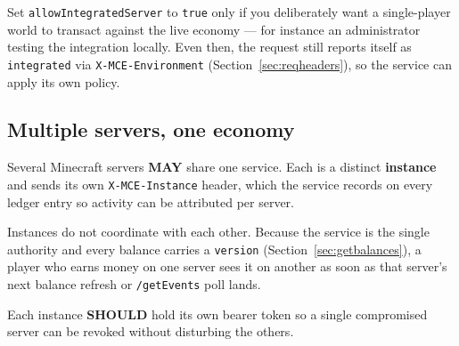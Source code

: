 \documentclass[11pt,a4paper]{article}
\newcommand{\code}[1]{\texttt{\small #1}}
\newcommand{\rec}{\textbf{SHOULD}}
\newcommand{\opt}{\textbf{MAY}}
\begin{document}
Set \code{allowIntegratedServer} to \code{true} only if you deliberately want a single-player world
to transact against the live economy --- for instance an administrator testing the integration
locally. Even then, the request still reports itself as \code{integrated} via
\code{X-MCE-Environment} (Section~\ref{sec:reqheaders}), so the service can apply its own policy.

\subsection{Multiple servers, one economy}

Several Minecraft servers \opt{} share one service. Each is a distinct \textbf{instance} and sends
its own \code{X-MCE-Instance} header, which the service records on every ledger entry so activity
can be attributed per server.

Instances do not coordinate with each other. Because the service is the single authority and every
balance carries a \code{version} (Section~\ref{sec:getbalances}), a player who earns money on one
server sees it on another as soon as that server's next balance refresh or \code{/getEvents} poll
lands.

\begin{figure}[h]
\centering
{}
\end{figure}

Each instance \rec{} hold its own bearer token so a single compromised server can be revoked
without disturbing the others.
\end{document}
